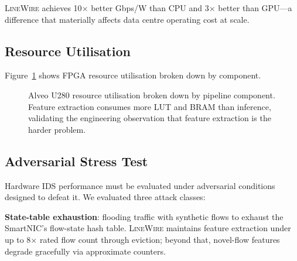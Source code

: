 \documentclass[sigconf,nonacm]{acmart}
\begin{document}
\textsc{LineWire} achieves 10$\times$ better Gbps/W than CPU and
3$\times$ better than GPU---a difference that materially affects data
centre operating cost at scale.

\subsection{Resource Utilisation}

Figure~\ref{fig:resource} shows FPGA resource utilisation broken down
by component.

\begin{figure}[h]
\centering
{}
\caption{Alveo U280 resource utilisation broken down by pipeline
  component. Feature extraction consumes more LUT and BRAM than
  inference, validating the engineering observation that feature
  extraction is the harder problem.}
\label{fig:resource}
\end{figure}

\subsection{Adversarial Stress Test}

Hardware IDS performance must be evaluated under adversarial conditions
designed to defeat it. We evaluated three attack classes:

\textbf{State-table exhaustion}: flooding traffic with synthetic flows
to exhaust the SmartNIC's flow-state hash table. \textsc{LineWire}
maintains feature extraction under up to 8$\times$ rated flow count
through eviction; beyond that, novel-flow features degrade
gracefully via approximate counters.
\end{document}
